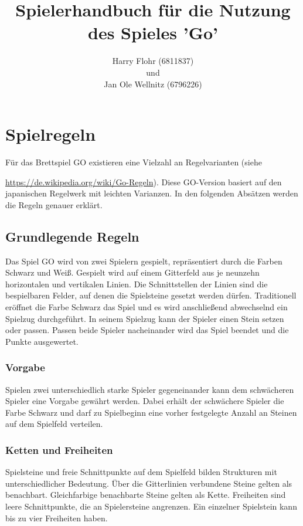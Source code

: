\documentclass[a4paper]{scrreprt}
\begin{document}
 
\title{Spielerhandbuch für die Nutzung des Spieles 'Go'}
\author{Harry Flohr (6811837)\\und\\Jan Ole Wellnitz (6796226)}
\maketitle

\tableofcontents 
 
 \chapter{Spielregeln}

Für das Brettspiel GO existieren eine Vielzahl an Regelvarianten (siehe{\url {https://de.wikipedia.org/wiki/Go-Regeln}). Diese GO-Version basiert auf den japanischen Regelwerk mit leichten Varianzen. In den folgenden Absätzen werden die Regeln genauer erklärt. 

\section{Grundlegende Regeln}
\label{sec:Grundlagen}
Das Spiel GO wird von zwei Spielern gespielt, repräsentiert durch die Farben Schwarz und Weiß. Gespielt wird auf einem Gitterfeld aus je neunzehn horizontalen und vertikalen Linien. Die Schnittstellen der Linien sind die bespielbaren Felder, auf denen die Spielsteine gesetzt werden dürfen. Traditionell eröffnet die Farbe Schwarz das Spiel und es wird anschließend abwechselnd ein Spielzug durchgeführt. In seinem Spielzug kann der Spieler einen Stein setzen oder passen. Passen beide Spieler nacheinander wird das Spiel beendet und die Punkte ausgewertet.

\subsection{Vorgabe}
Spielen zwei unterschiedlich starke Spieler gegeneinander kann dem schwächeren Spieler eine Vorgabe gewährt werden. Dabei erhält der schwächere Spieler die Farbe Schwarz und darf zu Spielbeginn eine vorher festgelegte Anzahl an Steinen auf dem Spielfeld verteilen. 

\subsection{Ketten und Freiheiten}
Spielsteine und freie Schnittpunkte auf dem Spielfeld bilden Strukturen mit unterschiedlicher Bedeutung. Über die Gitterlinien verbundene Steine gelten als benachbart. Gleichfarbige benachbarte Steine gelten als Kette. Freiheiten sind leere Schnittpunkte, die an Spielersteine angrenzen. Ein einzelner Spielstein kann bis zu vier Freiheiten haben. \\

}
\end{document}
